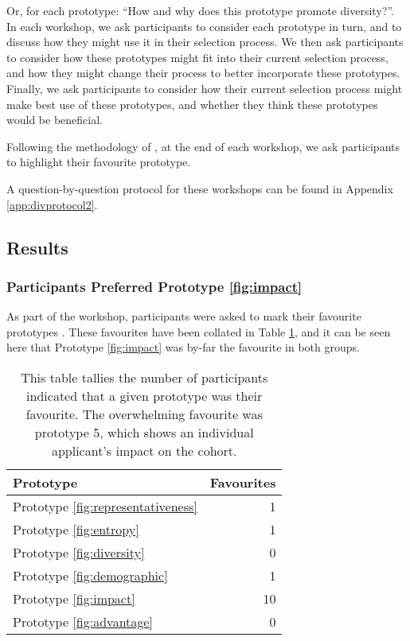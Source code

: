 \noindent Or, for each prototype: ``How and why does this prototype promote diversity?''. In each workshop, we ask participants to consider each prototype in turn, and to discuss how they might use it in their selection process. We then ask participants to consider how these prototypes might fit into their current selection process, and how they might change their process to better incorporate these prototypes. Finally, we ask participants to consider how their current selection process might make best use of these prototypes, and whether they think these prototypes would be beneficial. 

Following the methodology of \textcite{Gatian_1994,Griffiths_Johnson_Hartley_2007}, at the end of each workshop, we ask participants to highlight their favourite prototype.

A question-by-question protocol for these workshops can be found in Appendix \ref{app:divprotocol2}.

\subsection{Results}\label{ssec:results2}
\subsubsection{Participants Preferred Prototype \ref{fig:impact}}
As part of the workshop, participants were asked to mark their favourite prototypes \cite{Gatian_1994,Griffiths_Johnson_Hartley_2007}. These favourites have been collated in Table \ref{tab:favourites}, and it can be seen here that Prototype \ref{fig:impact} was by-far the favourite in both groups.

\begin{table}[htbp]
    \centering
    \caption{This table tallies the number of participants indicated that a given prototype was their favourite. The overwhelming favourite was prototype 5, which shows an individual applicant's impact on the cohort.}
    \label{tab:favourites}
    \begin{tabular}{lr}
        \toprule
        \textbf{Prototype} & \textbf{Favourites} \\
        \midrule
        Prototype \ref{fig:representativeness} & 1 \\
        Prototype \ref{fig:entropy} & 1 \\
        Prototype \ref{fig:diversity} & 0 \\
        Prototype \ref{fig:demographic} & 1 \\
        Prototype \ref{fig:impact} & 10 \\
        Prototype \ref{fig:advantage} & 0 \\
        \bottomrule
    \end{tabular}
\end{table}

